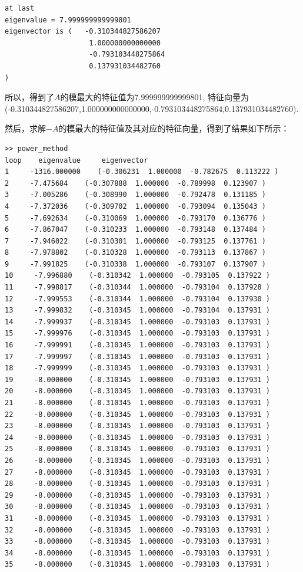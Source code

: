 \documentclass[12pt,a4paper,utf8]{ctexart}
\begin{document}
\begin{enumerate}
\begin{itemize}
\begin{lstlisting}
at last
eigenvalue = 7.999999999999801
eigenvector is (   -0.310344827586207
                    1.000000000000000
                    -0.793103448275864
                    0.137931034482760
)   
\end{lstlisting}
    \par
    所以，得到了$A$的模最大的特征值为7.999999999999801,
    特征向量为(-0.310344827586207,1.000000000000000,-0.793103448275864,0.137931034482760).

    \par
    然后，求解$-A$的模最大的特征值及其对应的特征向量，得到了结果如下所示：
    \begin{lstlisting}
>> power_method
loop    eigenvalue     eigenvector
1     -1316.000000    (-0.306231  1.000000  -0.782675  0.113222 )
2     -7.475684    (-0.307888  1.000000  -0.789998  0.123907 )
3     -7.005286    (-0.308990  1.000000  -0.792478  0.131185 )
4     -7.372036    (-0.309702  1.000000  -0.793094  0.135043 )
5     -7.692634    (-0.310069  1.000000  -0.793170  0.136776 )
6     -7.867047    (-0.310233  1.000000  -0.793148  0.137484 )
7     -7.946022    (-0.310301  1.000000  -0.793125  0.137761 )
8     -7.978802    (-0.310328  1.000000  -0.793113  0.137867 )
9     -7.991825    (-0.310338  1.000000  -0.793107  0.137907 )
10     -7.996880    (-0.310342  1.000000  -0.793105  0.137922 )
11     -7.998817    (-0.310344  1.000000  -0.793104  0.137928 )
12     -7.999553    (-0.310344  1.000000  -0.793104  0.137930 )
13     -7.999832    (-0.310345  1.000000  -0.793104  0.137931 )
14     -7.999937    (-0.310345  1.000000  -0.793103  0.137931 )
15     -7.999976    (-0.310345  1.000000  -0.793103  0.137931 )
16     -7.999991    (-0.310345  1.000000  -0.793103  0.137931 )
17     -7.999997    (-0.310345  1.000000  -0.793103  0.137931 )
18     -7.999999    (-0.310345  1.000000  -0.793103  0.137931 )
19     -8.000000    (-0.310345  1.000000  -0.793103  0.137931 )
20     -8.000000    (-0.310345  1.000000  -0.793103  0.137931 )
21     -8.000000    (-0.310345  1.000000  -0.793103  0.137931 )
22     -8.000000    (-0.310345  1.000000  -0.793103  0.137931 )
23     -8.000000    (-0.310345  1.000000  -0.793103  0.137931 )
24     -8.000000    (-0.310345  1.000000  -0.793103  0.137931 )
25     -8.000000    (-0.310345  1.000000  -0.793103  0.137931 )
26     -8.000000    (-0.310345  1.000000  -0.793103  0.137931 )
27     -8.000000    (-0.310345  1.000000  -0.793103  0.137931 )
28     -8.000000    (-0.310345  1.000000  -0.793103  0.137931 )
29     -8.000000    (-0.310345  1.000000  -0.793103  0.137931 )
30     -8.000000    (-0.310345  1.000000  -0.793103  0.137931 )
31     -8.000000    (-0.310345  1.000000  -0.793103  0.137931 )
32     -8.000000    (-0.310345  1.000000  -0.793103  0.137931 )
33     -8.000000    (-0.310345  1.000000  -0.793103  0.137931 )
34     -8.000000    (-0.310345  1.000000  -0.793103  0.137931 )
35     -8.000000    (-0.310345  1.000000  -0.793103  0.137931 )


\end{lstlisting}
\end{itemize}
\end{enumerate}
\end{document}
